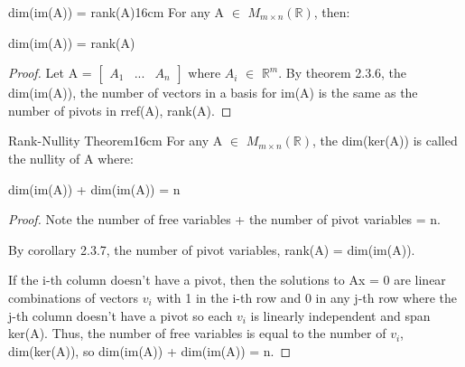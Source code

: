     \vspace{0.5cm}



    \begin{corollary}{dim(im(A)) = rank(A)}{16cm}
        For any A $\in$ $M_{m \times n}(\mathbb{R})$, then:

        \hspace{0.5cm}
        dim(im(A)) = rank(A)
    \end{corollary}

    \begin{proof}
        Let A =
        $\begin{bmatrix}
            A_1 & ... & A_n 
        \end{bmatrix}$ where $A_i$ $\in$ $\mathbb{R}^m$.
        By {\color{red} theorem 2.3.6}, the dim(im(A)),
        the number of vectors in a basis for im(A) is the
        same as the number of pivots in rref(A), rank(A).
    \end{proof}

    \vspace{0.5cm}



    \begin{wtheorem}{Rank-Nullity Theorem}{16cm}
        For any A $\in$ $M_{m \times n}(\mathbb{R})$,
        the dim(ker(A)) is called the {\color{lblue} nullity} of A where:

        \hspace{0.5cm}
        dim(im(A)) + dim(im(A)) = n
    \end{wtheorem}

    \begin{proof}
        Note the number of free variables + the number of pivot variables = n.

        By {\color{orange} corollary 2.3.7},
        the number of pivot variables, rank(A) = dim(im(A)).
        
        If the i-th column doesn't have a pivot, then the solutions to Ax = 0
        are linear combinations of vectors $v_i$ with 1 in the i-th row
        and 0 in any j-th row where the j-th column doesn't have a pivot
        so each $v_i$ is linearly independent and span ker(A).
        Thus, the number of free variables is equal to
        the number of $v_i$, dim(ker(A)), so dim(im(A)) + dim(im(A)) = n.
    \end{proof}

    \vspace{0.5cm}



